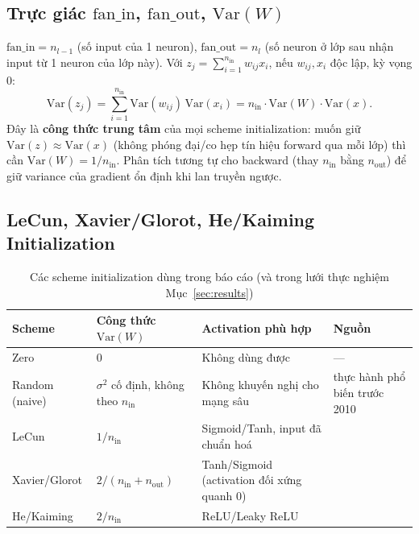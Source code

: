 \documentclass[12pt,a4paper]{article}
\begin{document}
\subsection{Trực giác $\mathrm{fan\_in}$, $\mathrm{fan\_out}$, $\mathrm{Var}(W)$}

$\mathrm{fan\_in}=n_{l-1}$ (số input của 1 neuron), $\mathrm{fan\_out}=n_l$
(số neuron ở lớp sau nhận input từ 1 neuron của lớp này). Với
$z_j=\sum_{i=1}^{n_{\text{in}}} w_{ij}x_i$, nếu $w_{ij},x_i$ độc lập, kỳ
vọng $0$:
$$\mathrm{Var}(z_j) = \sum_{i=1}^{n_{\text{in}}}\mathrm{Var}(w_{ij})\,\mathrm{Var}(x_i) = n_{\text{in}}\cdot\mathrm{Var}(W)\cdot\mathrm{Var}(x).$$
Đây là \textbf{công thức trung tâm} của mọi scheme initialization: muốn
giữ $\mathrm{Var}(z)\approx\mathrm{Var}(x)$ (không phóng đại/co hẹp tín
hiệu forward qua mỗi lớp) thì cần $\mathrm{Var}(W)=1/n_{\text{in}}$. Phân
tích tương tự cho backward (thay $n_{\text{in}}$ bằng $n_{\text{out}}$) để
giữ variance của gradient ổn định khi lan truyền ngược.

\subsection{LeCun, Xavier/Glorot, He/Kaiming Initialization}
\label{sec:schemes}

\begin{table}[htbp]
\centering
\caption{Các scheme initialization dùng trong báo cáo (và trong lưới thực nghiệm Mục~\ref{sec:results})}
\small
\begin{tabular}{@{}p{2.0cm}p{3.9cm}p{4.4cm}p{3.9cm}@{}}
\toprule
\textbf{Scheme} & \textbf{Công thức} $\mathrm{Var}(W)$ & \textbf{Activation phù hợp} & \textbf{Nguồn} \\
\midrule
Zero & $0$ & Không dùng được & --- \\
Random (naive) & $\sigma^2$ cố định, không theo $n_{\text{in}}$ & Không khuyến nghị cho mạng sâu & thực hành phổ biến trước 2010 \\
LeCun & $1/n_{\text{in}}$ & Sigmoid/Tanh, input đã chuẩn hoá & \citet{lecun1998efficient} \\
Xavier/Glorot & $2/(n_{\text{in}}+n_{\text{out}})$ & Tanh/Sigmoid (activation đối xứng quanh $0$) & \citet{glorot2010understanding} \\
He/Kaiming & $2/n_{\text{in}}$ & ReLU/Leaky ReLU & \citet{he2015delving} \\
\bottomrule
\end{tabular}
\label{tab:schemes}
\end{table}
\end{document}
